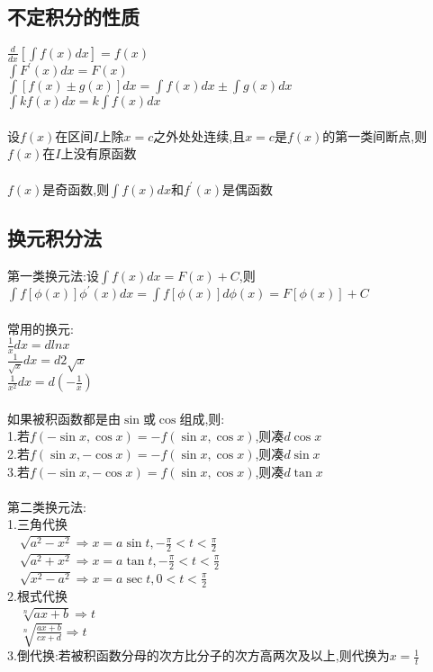 \documentclass{article}
\begin{document}
\begin{flushleft}
	\subsection{不定积分的性质}
	
	$\frac{d}{dx}[\int f(x)dx]=f(x)$\\
	$\int F^{'}(x)dx=F(x)$\\
	$\int [f(x)\pm g(x)]dx=\int f(x)dx \pm \int g(x)dx$\\
	$\int kf(x)dx=k\int f(x)dx$\\
	~\\
	设$f(x)$在区间$I$上除$x=c$之外处处连续,且$x=c$是$f(x)$的第一类间断点,则$f(x)$在$I$上没有原函数\\
	~\\
	$f(x)$是奇函数,则$\int f(x)dx$和$f^{'}(x)$是偶函数\\
	
	\subsection{换元积分法}
	
	第一类换元法:设$\int f(x)dx=F(x)+C$,则$\int f[\phi(x)]\phi^{'}(x)dx=\int f[\phi(x)]d\phi(x)=F[\phi(x)]+C$\\
	~\\
	常用的换元:\\
	$\frac{1}{x}dx=dlnx$\\
	$\frac{1}{\sqrt{x}}dx=d2\sqrt{x}$\\
	$\frac{1}{x^2}dx=d(-\frac{1}{x})$\\
	~\\
	如果被积函数都是由$\sin$或$\cos$组成,则:\\
	1.若$f(-\sin x,\cos x)=-f(\sin x,\cos x)$,则凑$d\cos x$\\
	2.若$f(\sin x,-\cos x)=-f(\sin x,\cos x)$,则凑$d\sin x$\\
	3.若$f(-\sin x,-\cos x)=f(\sin x,\cos x)$,则凑$d\tan x$\\
	~\\
	第二类换元法:\\
	1.三角代换\\
	\ \ $\sqrt{a^2-x^2} \Rightarrow x=a\sin t, -\frac{\pi}{2}<t<\frac{\pi}{2}$\\
	\ \ $\sqrt{a^2+x^2} \Rightarrow x=a\tan t, -\frac{\pi}{2}<t<\frac{\pi}{2}$\\
	\ \ $\sqrt{x^2-a^2} \Rightarrow x=a\sec t, 0<t<\frac{\pi}{2}$\\
	2.根式代换\\
	\ \ $\sqrt[n]{ax+b} \Rightarrow t$\\
	\ \ $\sqrt[n]{\frac{ax+b}{cx+d}} \Rightarrow t$\\
	3.倒代换:若被积函数分母的次方比分子的次方高两次及以上,则代换为$x=\frac{1}{t}$\\
	

\end{flushleft}
\end{document}
